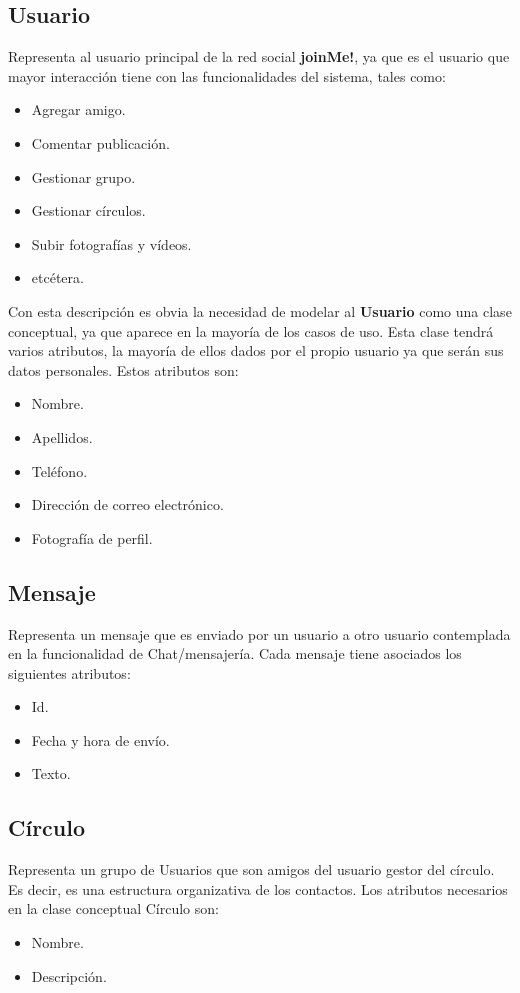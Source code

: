 \documentclass[12pt, a4paper, titlepage]{article}
\begin{document}
\subsection{Usuario}
	Representa al usuario principal de la red social \textbf{joinMe!}, ya que es el usuario que mayor interacción tiene con las funcionalidades del sistema, tales como:
	\begin{itemize}
		\item Agregar amigo.
		\item Comentar publicación.
		\item Gestionar grupo.
		\item Gestionar círculos.
		\item Subir fotografías y vídeos.
		\item etcétera.
	\end{itemize}
	Con esta descripción es obvia la necesidad de modelar al \textbf{Usuario} como una clase conceptual, ya que aparece en la mayoría de los casos de uso. Esta clase tendrá varios atributos, la mayoría de ellos dados por el propio usuario ya que serán sus datos personales.
	Estos atributos son:
	\begin{itemize}
		\item Nombre.
		\item Apellidos.
		\item Teléfono.
		\item Dirección de correo electrónico.
		\item Fotografía de perfil.
	\end{itemize}
	
\subsection{Mensaje}
	Representa un mensaje que es enviado por un usuario a otro usuario contemplada en la funcionalidad de Chat/mensajería. Cada mensaje tiene asociados los siguientes atributos:
	\begin{itemize}
		\item Id.
		\item Fecha y hora de envío.
		\item Texto.
	\end{itemize}
\subsection{Círculo}
	Representa un grupo de Usuarios que son amigos del usuario gestor del círculo. Es decir, es una estructura organizativa de los contactos. Los atributos necesarios en la clase conceptual Círculo son:
	\begin{itemize}
		\item Nombre.
		\item Descripción.
	\end{itemize}
\end{document}
